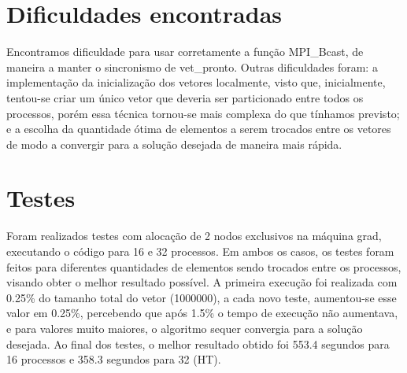 \documentclass{article}
\begin{document}
\begin{multicols*}{2}
\section{Dificuldades encontradas}
Encontramos dificuldade para usar corretamente a função MPI\_Bcast, de maneira a manter o sincronismo de vet\_pronto. Outras dificuldades foram: a implementação da inicialização dos vetores localmente, visto que, inicialmente, tentou-se criar um único vetor que deveria ser particionado entre todos os processos, porém essa técnica tornou-se mais complexa do que tínhamos previsto; e a escolha da quantidade ótima de elementos a serem trocados entre os vetores de modo a convergir para a solução desejada de maneira mais rápida.  
\section{Testes}
Foram realizados testes com alocação de 2 nodos exclusivos na máquina grad, executando o código para 16 e 32 processos. Em ambos os casos, os testes foram feitos para diferentes quantidades de elementos sendo trocados entre os processos, visando obter o melhor resultado possível. A primeira execução foi realizada com 0.25\% do tamanho total do vetor (1000000), a cada novo teste, aumentou-se esse valor em 0.25\%, percebendo que após 1.5\% o tempo de execução não aumentava, e para valores muito maiores, o algoritmo sequer convergia para a solução desejada. Ao final dos testes, o melhor resultado obtido foi 553.4 segundos para 16 processos e 358.3 segundos para 32 (HT).

\end{multicols*}
\end{document}
